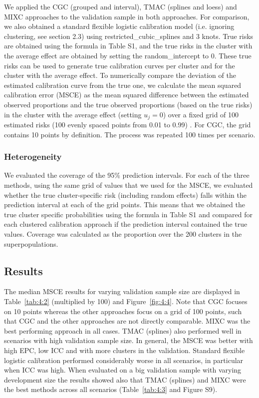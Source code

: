 We applied the \gls{CGC} (grouped and interval), \gls{TMAC} (splines and loess) and \gls{MIXC} approaches to the validation sample in both approaches. For comparison, we also obtained a standard flexible logistic calibration model (i.e. ignoring clustering, see section 2.3) using \gls{restricted_cubic_splines} and 3 knots. True risks are obtained using the formula in Table S1, and the true risks in the cluster with the average effect are obtained by setting the \gls{random_intercept} to 0. These true risks can be used to generate true calibration curves per cluster and for the cluster with the average effect. To numerically compare the deviation of the estimated calibration curve from the true one, we calculate the mean squared calibration error (\gls{MSCE}) as the mean squared difference between the estimated observed proportions and the true observed proportions (based on the true risks) in the cluster with the average effect (setting \(u_{j} = 0\)) over a fixed grid of 100 estimated risks (100 evenly spaced points from 0.01 to 0.99) \cite{vanhoordeSplinebasedToolAssess2015}. For \gls{CGC}, the grid contains 10 points by definition. The process was repeated 100 times per scenario.

\subsubsection{Heterogeneity}
We evaluated the coverage of the 95\% prediction intervals. For each of the three methods, using the same grid of values that we used for the \gls{MSCE}, we evaluated whether the true cluster-specific risk (including random effects) falls within the prediction interval at each of the grid points. This means that we obtained the true cluster specific probabilities using the formula in Table S1 and compared for each clustered calibration approach if the prediction interval contained the true values. Coverage was calculated as the proportion over the 200 clusters in the superpopulations.

\subsection{Results}
The median \gls{MSCE} results for varying validation sample size are displayed in Table~\ref{tab:4:2} (multiplied by 100) and Figure~\ref{fig:4:4}. Note that \gls{CGC} focuses on 10 points whereas the other approaches focus on a grid of 100 points, such that \gls{CGC} and the other approaches are not directly comparable. \gls{MIXC} was the best performing approach in all cases. \gls{TMAC} (splines) also performed well in scenarios with high validation sample size. In general, the \gls{MSCE} was better with high \gls{EPC}, low \gls{ICC} and with more clusters in the validation. Standard flexible logistic calibration performed considerably worse in all scenarios, in particular when \gls{ICC} was high. When evaluated on a big validation sample with varying development size the results showed also that \gls{TMAC} (splines) and \gls{MIXC} were the best methods across all scenarios (Table~\ref{tab:4:3} and Figure S9).

